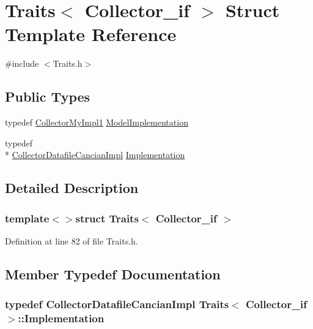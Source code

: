 \hypertarget{struct_traits_3_01_collector__if_01_4}{\section{Traits$<$ Collector\-\_\-if $>$ Struct Template Reference}
\label{struct_traits_3_01_collector__if_01_4}
}


{\ttfamily \#include $<$Traits.\-h$>$}

\subsection*{Public Types}
\begin{DoxyCompactItemize}
\item 
typedef \hyperlink{class_collector_my_impl1}{Collector\-My\-Impl1} \hyperlink{struct_traits_3_01_collector__if_01_4_a38ef8e0ef3488a361965174720a895ae}{Model\-Implementation}
\item 
typedef \\*
\hyperlink{class_collector_datafile_cancian_impl}{Collector\-Datafile\-Cancian\-Impl} \hyperlink{struct_traits_3_01_collector__if_01_4_ace32b8f4a29ef663d7f4dcf5e0971ef8}{Implementation}
\end{DoxyCompactItemize}


\subsection{Detailed Description}
\subsubsection*{template$<$$>$struct Traits$<$ Collector\-\_\-if $>$}



Definition at line 82 of file Traits.\-h.



\subsection{Member Typedef Documentation}
\hypertarget{struct_traits_3_01_collector__if_01_4_ace32b8f4a29ef663d7f4dcf5e0971ef8}{
\subsubsection[{Implementation}]{\setlength{\rightskip}{0pt plus 5cm}typedef {\bf Collector\-Datafile\-Cancian\-Impl} {\bf Traits}$<$ {\bf Collector\-\_\-if} $>$\-::{\bf Implementation}}}\label{struct_traits_3_01_collector__if_01_4_ace32b8f4a29ef663d7f4dcf5e0971ef8}


